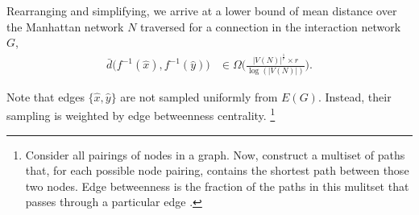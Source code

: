 Rearranging and simplifying, we arrive at a lower bound of mean distance over the Manhattan network $N$ traversed for a connection in the interaction network $G$,
\begin{align*}
\bar{d}\Big(f^{-1}(\hat{x}), f^{-1}(\hat{y})\Big)
&\in
\Omega \Big(
  \frac{
    |V(N)|^{\frac{1}{r}} \times r
  }{
    \log(|V(N)|)
  }
\Big).
\end{align*}

Note that edges $\{\hat{x},\hat{y}\}$ are not sampled uniformly from $E(G)$.
Instead, their sampling is weighted by edge betweenness centrality.
\footnote{
Consider all pairings of nodes in a graph.
Now, construct a multiset of paths that, for each possible node pairing, contains the shortest path between those two nodes.
Edge betweenness is the fraction of the paths in this mulitset that passes through a particular edge \citep{Lu2013}.
}

